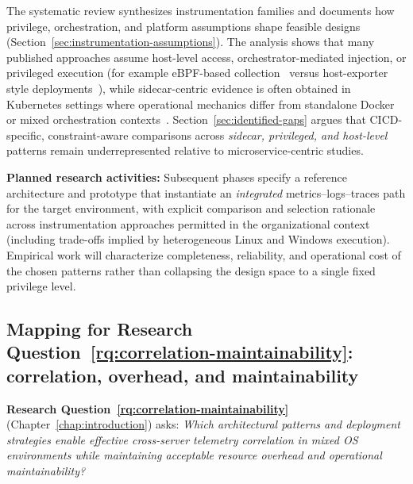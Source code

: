 The systematic review synthesizes instrumentation families and documents how privilege, orchestration, and platform assumptions shape feasible designs (Section~\ref{sec:instrumentation-assumptions}). The analysis shows that many published approaches assume host-level access, orchestrator-mediated injection, or privileged execution (for example \gls{eBPF}-based collection~\parencite{sharmaEBPFEnhancedCompleteObservability2024,kannanDesigningLightweightNetwork2024} versus host-exporter style deployments~\parencite{correiaMonintainerOrchestrationindependentExtensible2023,dingaEmpiricalEvaluationEnergy2023}), while sidecar-centric evidence is often obtained in Kubernetes settings where operational mechanics differ from standalone Docker or mixed orchestration contexts~\parencite{hasanthEvaluatingPerformanceSidecarbased2024,salcedo-navarroK8sidecarModularKubernetes2025,sahuSidecarsCentralLane2023}. Section~\ref{sec:identified-gaps} argues that \ac{CICD}-specific, constraint-aware comparisons across \emph{sidecar, privileged, and host-level} patterns remain underrepresented relative to microservice-centric studies.

\textbf{Planned research activities:} Subsequent phases specify a reference architecture and prototype that instantiate an \emph{integrated} metrics--logs--traces path for the target environment, with explicit comparison and selection rationale across instrumentation approaches permitted in the organizational context (including trade-offs implied by heterogeneous Linux and Windows execution). Empirical work will characterize completeness, reliability, and operational cost of the chosen patterns rather than collapsing the design space to a single fixed privilege level.

\subsection{\texorpdfstring{Mapping for Research Question~\ref{rq:correlation-maintainability}: correlation, overhead, and maintainability}{Mapping for Research Question 2: correlation, overhead, and maintainability}}
\label{sec:rq2-mapping}

\textbf{Research Question~\ref{rq:correlation-maintainability}} (Chapter~\ref{chap:introduction}) asks: \textit{Which architectural patterns and deployment strategies enable effective cross-server telemetry correlation in mixed OS environments while maintaining acceptable resource overhead and operational maintainability?}

